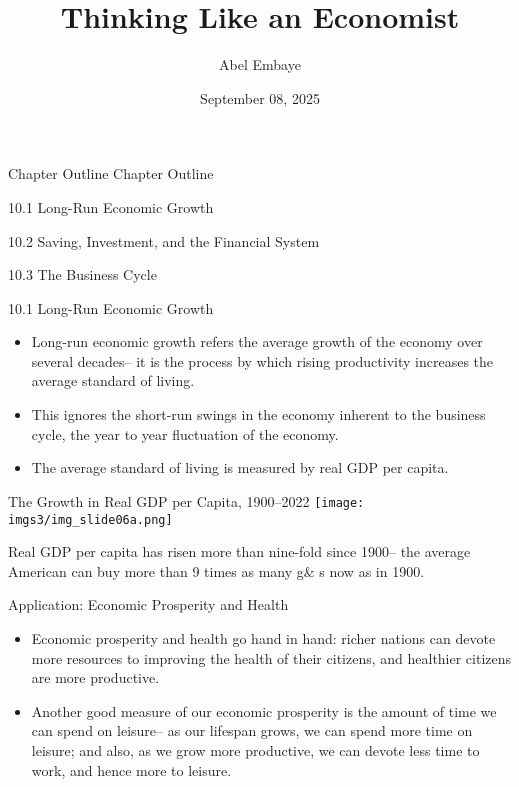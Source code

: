 \documentclass[
  12pt,
  ignorenonframetext,
]{beamer}
\title{Thinking Like an Economist}
\author{Abel Embaye}
\date{September 08, 2025}
\institute{Department of Economics\\
\strut \\
UofA\\}
\begin{document}
\frame{\titlepage}

\begin{frame}{Chapter Outline}
\protect\hypertarget{chapter-outline}{}
Chapter Outline

10.1 Long-Run Economic Growth

10.2 Saving, Investment, and the Financial System

10.3 The Business Cycle
\end{frame}

\begin{frame}{10.1 Long-Run Economic Growth}
\protect\hypertarget{long-run-economic-growth}{}
\begin{itemize}
\item
  Long-run economic growth refers the average growth of the economy over
  several decades-- it is the process by which rising productivity
  increases the average standard of living.
\item
  This ignores the short-run swings in the economy inherent to the
  business cycle, the year to year fluctuation of the economy.
\item
  The average standard of living is measured by real GDP per capita.
\end{itemize}
\end{frame}

\begin{frame}{The Growth in Real GDP per Capita, 1900--2022}
\protect\hypertarget{the-growth-in-real-gdp-per-capita-19002022}{}
\texttt{[image: imgs3/img\_slide06a.png]}

Real GDP per capita has risen more than nine-fold since 1900-- the
average American can buy more than 9 times as many g\& s now as in 1900.
\end{frame}

\begin{frame}{Application: Economic Prosperity and Health}
\protect\hypertarget{application-economic-prosperity-and-health}{}
\begin{itemize}
\item
  Economic prosperity and health go hand in hand: richer nations can
  devote more resources to improving the health of their citizens, and
  healthier citizens are more productive.
\item
  Another good measure of our economic prosperity is the amount of time
  we can spend on leisure-- as our lifespan grows, we can spend more
  time on leisure; and also, as we grow more productive, we can devote
  less time to work, and hence more to leisure.
\end{itemize}
\end{frame}
\end{document}
